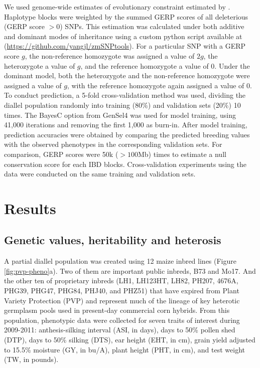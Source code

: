 \documentclass[9pt,twocolumn,twoside]{gsajnl}
\begin{document}
We used genome-wide estimates of evolutionary constraint \citep[GERP][]{Davydov2010} estimated by \citet{rodgers2015recombination}. 
Haplotype blocks were weighted by the summed GERP scores of all deleterious (GERP score $>0$) SNPs\DIFaddbegin {}\DIFaddend . 
This estimation was calculated under both additive and dominant modes of inheritance using a custom python script available at (\url{https://github.com/yangjl/zmSNPtools}). 
For a particular SNP with a GERP score $g$, the non-reference homozygote was assigned a value of $2g$, the heterozygote a value of $g$, and the reference homozygote a value of 0.  
Under the dominant model, both the heterozygote and the non-reference homozygote were assigned a value of $g$, with the reference homozygote again assigned a value of 0.
To conduct prediction, a 5-fold cross-validation method was used, dividing the diallel population  randomly  into training (80\%) and validation sets (20\%)  10 times. 
The BayesC option from GenSel4 \citep{habier2011extension} was used for model training, using 41,000 iterations and removing the first 1,000 as burn-in. 
\DIFdelbegin \DIFdelend After model training, prediction accuracies were obtained by comparing the predicted breeding values with the observed phenotypes in the corresponding validation sets. 
For comparison, GERP scores were \DIFdelbegin {}\DIFdelend \DIFaddbegin {}\DIFaddend 50k \DIFdelbegin {}\DIFdelend \DIFaddbegin {}\DIFaddend ($> 100$Mb) \DIFaddbegin {} times to estimate a null conservation score for each IBD blocks. 
Cross-validation experiments using the \DIFdelbegin {}\DIFdelend \DIFaddbegin {}\DIFaddend data were conducted on the same training and validation sets.  





\section*{Results}


\subsection*{Genetic values, heritability and heterosis}

A partial diallel population was created using 12 maize inbred lines (Figure \ref{fig:pvp-pheno}a). 
Two of them are important public inbreds, B73 and Mo17. And the other ten of proprietary inbreds (LH1, LH123HT, LH82, PH207, 4676A, PHG39, PHG47, PHG84, PHJ40, and PHZ51) that have expired from Plant Variety Protection (PVP) and represent much of the lineage of key heterotic germplasm pools used in present-day commercial corn hybrids. 
From this population, phenotypic data were collected for seven traits of interest during 2009-2011: anthesis-silking interval (ASI, in days), days to 50\% pollen shed (DTP), days to 50\% silking (DTS), ear height (EHT, in cm), grain yield adjusted to 15.5\% moisture (GY, in bu/A), plant height (PHT, in cm), and test weight (TW, in pounds).
\end{document}
